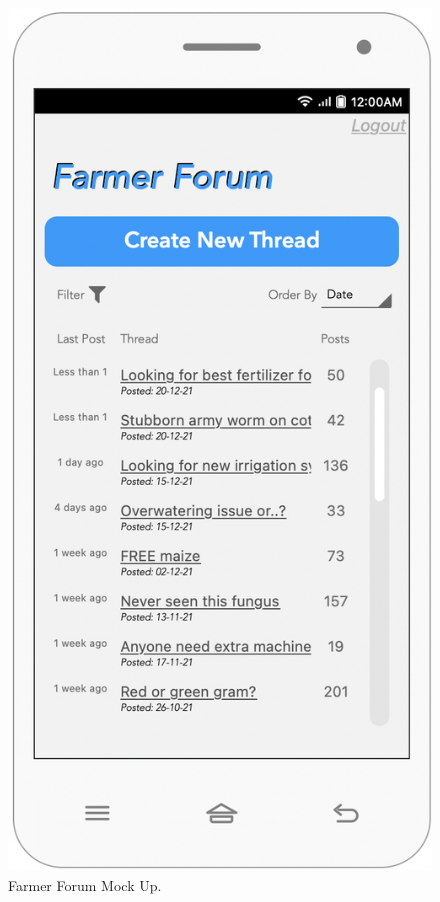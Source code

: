 \begin{multicols}{3}
 
\begin{figure}[H]
 \centering
\includegraphics[scale=0.35]{../images_diagrams/mock_ups/farmerforum100.png}
\caption{\label{fig:mock_forum}Farmer Forum Mock Up.}
 \end{figure}
 

\end{multicols}

